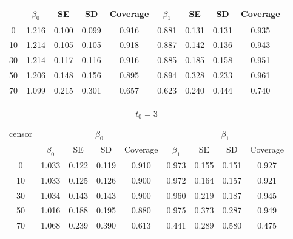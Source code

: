 \documentclass[12pt]{article}
\begin{document}
\begin{enumerate}
\begin{table}[hbt!]
\begin{tabular}{|c|c|c|c|c|c|c|c|c|}
		& $\beta_0$ & SE & SD  & Coverage  & $\beta_1$ & SE & SD & Coverage\\
		\hline\hline
		0 & 1.216 & 0.100 & 0.099 & 0.916 & 0.881 & 0.131 & 0.131 & 0.935 \\ 
  10 & 1.214 & 0.105 & 0.105 & 0.918 & 0.887 & 0.142 & 0.136 & 0.943 \\ 
  30 & 1.214 & 0.117 & 0.116 & 0.916 & 0.885 & 0.185 & 0.158 & 0.951 \\ 
  50 & 1.206 & 0.148 & 0.156 & 0.895 & 0.894 & 0.328 & 0.233 & 0.961 \\ 
  70 & 1.099 & 0.215 & 0.301 & 0.657 & 0.623 & 0.240 & 0.444 & 0.740 \\  
		\hline
	\end{tabular}
\end{table}
\begin{table}[hbt!]
	\caption{$t_0=3$}
	\centering
	\begin{tabular}{|c|c|c|c|c|c|c|c|c|}
		\hline
		\multirow{2}{*}{censor} & \multicolumn{4}{c|}{$\beta_0$} & \multicolumn{4}{c|}{$\beta_1$}\\ \cline{2-9}
		& $\beta_0$ & SE & SD  & Coverage  & $\beta_1$ & SE & SD & Coverage\\
		\hline\hline
		0 & 1.033 & 0.122 & 0.119 & 0.910 & 0.973 & 0.155 & 0.151 & 0.927 \\ 
  10 & 1.033 & 0.125 & 0.126 & 0.900 & 0.972 & 0.164 & 0.157 & 0.921 \\ 
  30 & 1.034 & 0.143 & 0.143 & 0.900 & 0.960 & 0.219 & 0.187 & 0.945 \\ 
  50 & 1.016 & 0.188 & 0.195 & 0.880 & 0.975 & 0.373 & 0.287 & 0.949 \\ 
  70 & 1.068 & 0.239 & 0.390 & 0.613 & 0.441 & 0.289 & 0.580 & 0.475 \\ 
		\hline
	\end{tabular}
\end{table}
\end{enumerate}
\end{document}
